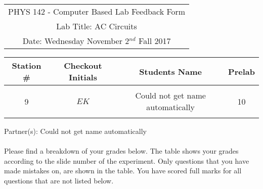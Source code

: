 \documentclass{article}
\begin{document}

\clearpage\begin{table}[h]
	\centering
	\begin{tabular}{c}
	PHYS 142 - Computer Based Lab Feedback Form\\
	Lab Title: AC Circuits\\Date: Wednesday November 2$^{nd}$ Fall 2017 \\\hline
\end{tabular}
\end{table}
\begin{table}[h]\centering \begin{tabular}{|c|c|p{9.9 cm}|c|}\hline Station \#  & Checkout Initials & \multicolumn{1}{|c|}{Students Name} & Prelab \\\hline\multirow{3}{*}{9}& \multirow{3}{*}{$EK$} & &\\& &\multicolumn{1}{|c|}{Could not get name automatically}&10\\&   &  &\\\hline
\end{tabular}
\end{table}
Partner(s): Could not get name automatically\\
\\Please find a breakdown of your grades below. The table shows your grades according to the slide number of the experiment. Only questions that you have made mistakes on, are shown in the table. You have scored full marks for all questions that are not listed below.
\end{document}
